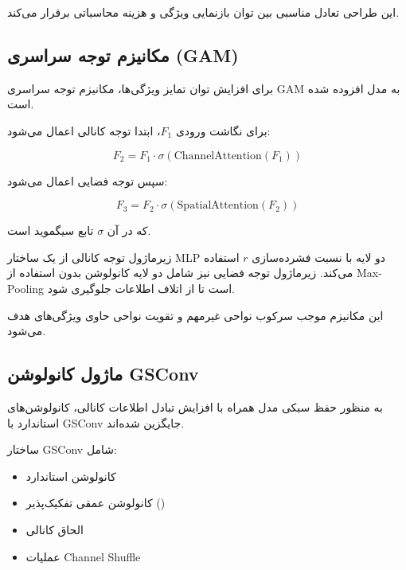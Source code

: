 \documentclass[a4paper, 10pt, twocolumn]{article}
\begin{document}
	این طراحی تعادل مناسبی بین توان بازنمایی ویژگی و هزینه محاسباتی برقرار می‌کند.
	
	
	\subsection{مکانیزم توجه سراسری (GAM)}
	
	برای افزایش توان تمایز ویژگی‌ها، مکانیزم توجه سراسری GAM به مدل افزوده شده است.
	
	برای نگاشت ورودی $F_1$، ابتدا توجه کانالی اعمال می‌شود:
	
	\begin{equation}
		F_2 = F_1 \cdot \sigma(\text{ChannelAttention}(F_1))
	\end{equation}
	
	سپس توجه فضایی اعمال می‌شود:
	
	\begin{equation}
		F_3 = F_2 \cdot \sigma(\text{SpatialAttention}(F_2))
	\end{equation}
	
	که در آن $\sigma$ تابع سیگموید است.
	
	زیرماژول توجه کانالی از یک ساختار MLP دو لایه با نسبت فشرده‌سازی $r$ استفاده می‌کند. زیرماژول توجه فضایی نیز شامل دو لایه کانولوشن بدون استفاده از Max-Pooling است تا از اتلاف اطلاعات جلوگیری شود.
	
	این مکانیزم موجب سرکوب نواحی غیرمهم و تقویت نواحی حاوی ویژگی‌های هدف می‌شود.
	
	
	\subsection{ماژول کانولوشن GSConv}
	
	به منظور حفظ سبکی مدل همراه با افزایش تبادل اطلاعات کانالی، کانولوشن‌های استاندارد با GSConv جایگزین شده‌اند.
	
	ساختار GSConv شامل:
	
	\begin{itemize}
		\item کانولوشن استاندارد
		\item کانولوشن عمقی تفکیک‌پذیر ()
		\item الحاق کانالی
		\item عملیات Channel Shuffle
	\end{itemize}
	
\end{document}

